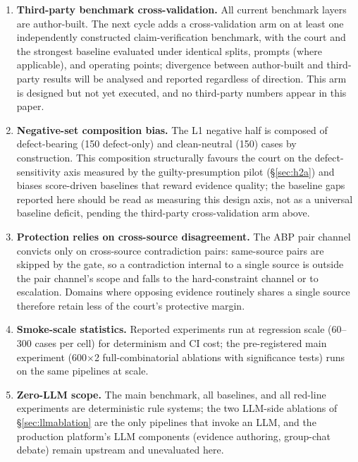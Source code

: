 \documentclass[11pt]{article}
\begin{document}
\begin{enumerate}[leftmargin=2em,itemsep=2pt]
including a neutral negative family (target FPR $=0$ under the same
gate-purity red line as L1.5), have every case annotated by three domain
experts under the dual-track protocol (three experts plus an independent
evidence-verification track), and report Krippendorff's $\alpha$ even if
low, following \citealp{cecil2026beyond}; the pre-registered acceptance
red line is that ABP recall on expert-adjudicated L2 must stay within the
Wilson interval reported in \S\ref{sec:ddb}. Results below that bound
would falsify the generalisation claim and will be reported as such.
\item \textbf{Third-party benchmark cross-validation.} All current
benchmark layers are author-built. The next cycle adds a cross-validation
arm on at least one independently constructed claim-verification benchmark,
with the court and the strongest baseline evaluated under identical
splits, prompts (where applicable), and operating points; divergence
between author-built and third-party results will be analysed and reported
regardless of direction. This arm is designed but not yet executed, and no
third-party numbers appear in this paper.
\item \textbf{Negative-set composition bias.} The L1 negative half is
composed of defect-bearing (150 defect-only) and clean-neutral (150) cases
by construction. This composition structurally favours the court on the
defect-sensitivity axis measured by the guilty-presumption pilot
(\S\ref{sec:h2a}) and biases score-driven baselines that reward evidence
quality; the baseline gaps reported here should be read as measuring this
design axis, not as a universal baseline deficit, pending the third-party
cross-validation arm above.
\item \textbf{Protection relies on cross-source disagreement.} The ABP
pair channel convicts only on cross-source contradiction pairs: same-source
pairs are skipped by the gate, so a contradiction internal to a single
source is outside the pair channel's scope and falls to the hard-constraint
channel or to escalation. Domains where opposing evidence routinely shares
a single source therefore retain less of the court's protective margin.
\item \textbf{Smoke-scale statistics.} Reported experiments run at
regression scale (60--300 cases per cell) for determinism and CI cost; the
pre-registered main experiment (600$\times$2 full-combinatorial ablations
with significance tests) runs on the same pipelines at scale.
\item \textbf{Zero-LLM scope.} The main benchmark, all baselines, and all
red-line experiments are deterministic rule systems; the two LLM-side
ablations of \S\ref{sec:llmablation} are the only pipelines that invoke an
LLM, and the production platform's LLM components (evidence authoring,
group-chat debate) remain upstream and unevaluated here.
\end{enumerate}
\end{document}
